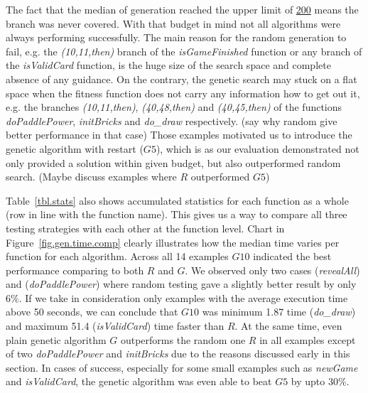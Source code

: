 \documentclass[sigconf]{acmart}
\begin{document}
The fact that the median of generation reached the upper limit of \underline{200} means the branch was never covered. With that budget in mind not all algorithms were always performing successfully. The main reason for the random generation to fail, e.g. the \emph{(10,11,then)} branch of the \emph{isGameFinished} function or any branch of the \emph{isValidCard} function, is the huge size of the search space and complete absence of any guidance. On the contrary, the genetic search may stuck on a flat space when the fitness function does not carry any information how to get out it, e.g. the branches \emph{(10,11,then)}, \emph{(40,48,then)} and \emph{(40,45,then)} of the functions \emph{doPaddlePower}, \emph{initBricks} and \emph{do_draw} respectively. (say why random give better performance in that case) Those examples motivated us to introduce the genetic algorithm with restart ($G5$), which is as our evaluation demonstrated not only provided a solution within given budget, but also outperformed random search. (Maybe discuss examples where $R$ outperformed $G5$)

Table~\ref{tbl.stats} also shows accumulated statistics for each function as a whole (row in line with the function name). This gives us a way to compare  all three testing strategies with each other at the function level. Chart in Figure~\ref{fig.gen.time.comp} clearly illustrates how the median time varies per function for each algorithm. Across all 14 examples $G10$ indicated the best performance comparing to both $R$ and $G$. We observed only two cases (\emph{revealAll}) and (\emph{doPaddlePower}) where random testing gave a slightly better result by only 6\%. If we take in consideration only examples with the average execution time above 50 seconds, we can conclude that $G10$ was minimum 1.87 time (\emph{do_draw}) and maximum 51.4 (\emph{isValidCard}) time faster than $R$. At the same time, even plain genetic algorithm $G$ outperforms the random one $R$ in all examples except of two \emph{doPaddlePower} and \emph{initBricks} due to the reasons discussed early in this section. In cases of success, especially for some small examples such as \emph{newGame} and \emph{isValidCard}, the genetic algorithm was even able to beat $G5$ by upto 30\%.  
\end{document}
